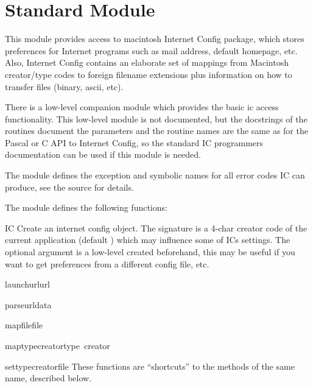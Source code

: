 \section{Standard Module }

\renewcommand{\indexsubitem}{(in module ic)}

This module provides access to macintosh Internet Config package,
which stores preferences for Internet programs such as mail address,
default homepage, etc. Also, Internet Config contains an elaborate set
of mappings from Macintosh creator/type codes to foreign filename
extensions plus information on how to transfer files (binary, ascii,
etc). 

There is a low-level companion module  which provides the
basic ic access functionality. This low-level module is not
documented, but the docstrings of the routines document the parameters
and the routine names are the same as for the Pascal or C API to
Internet Config, so the standard IC programmers documentation can be
used if this module is needed.

The  module defines the  exception and symbolic
names for all error codes IC can produce, see the source for details.

The  module defines the following functions:

\begin{funcdesc}{IC}{}
Create an internet config object. The signature is a 4-char creator
code of the current application (default ) which may
influence some of ICs settings. The optional  argument is a
low-level  created beforehand, this may be useful if
you want to get preferences from a different config file, etc.
\end{funcdesc}

\begin{funcdesc}{launchurl}{url }
\end{funcdesc}
\begin{funcdesc}{parseurl}{data }
\end{funcdesc}
\begin{funcdesc}{mapfile}{file}
\end{funcdesc}
\begin{funcdesc}{maptypecreator}{type\, creator }
\end{funcdesc}
\begin{funcdesc}{settypecreator}{file}
These functions are ``shortcuts'' to the methods of the same name,
described below.
\end{funcdesc}


